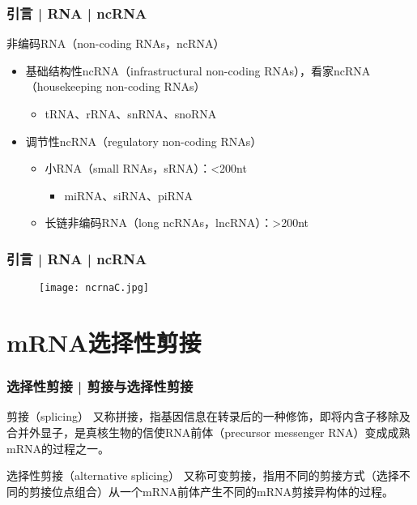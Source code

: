 \begin{frame}
  \frametitle{引言 | RNA | ncRNA}
  \begin{block}{非编码RNA（non-coding RNAs，ncRNA）}
  \begin{itemize}
    \item 基础结构性ncRNA（infrastructural non-coding RNAs），看家ncRNA（housekeeping non-coding RNAs）
      \begin{itemize}
        \item tRNA、rRNA、snRNA、snoRNA
      \end{itemize}
    \item 调节性ncRNA（regulatory non-coding RNAs）
      \begin{itemize}
        \item 小RNA（small RNAs，sRNA）：\textless 200nt
          \begin{itemize}
            \item miRNA、siRNA、piRNA
          \end{itemize}
        \item 长链非编码RNA（long ncRNAs，lncRNA）：\textgreater 200nt
      \end{itemize}
  \end{itemize}
\end{block}
\end{frame}

\begin{frame}
  \frametitle{引言 | RNA | ncRNA}
  \begin{figure}
    \centering
    \texttt{[image: ncrnaC.jpg]}
  \end{figure}
\end{frame}

\section{mRNA选择性剪接}
\begin{frame}
  \frametitle{选择性剪接 | \alert{剪接与选择性剪接}}
  \begin{block}{剪接（splicing）}
    又称拼接，指基因信息在转录后的一种修饰，即将内含子移除及合并外显子，是真核生物的信使RNA前体（precursor messenger RNA）变成成熟mRNA的过程之一。
  \end{block}
  \pause
  \begin{block}{选择性剪接（alternative splicing）}
    又称可变剪接，指用不同的剪接方式（选择不同的剪接位点组合）从一个mRNA前体产生不同的mRNA剪接异构体的过程。
  \end{block}
\end{frame}

